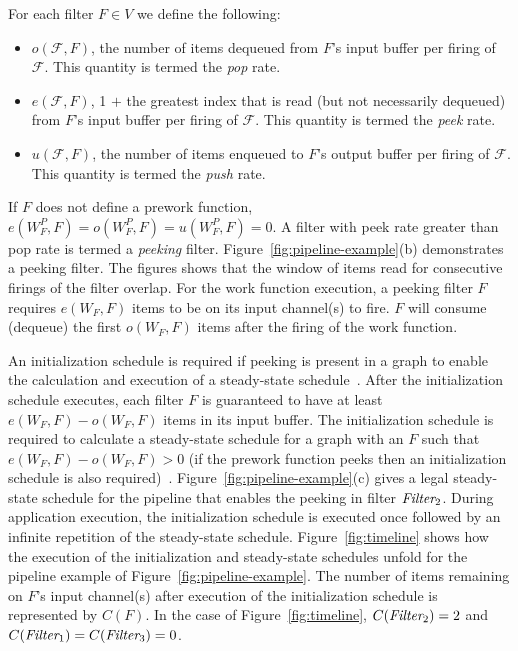 For each filter $F \in V$ we define the following:
\begin{itemize}

\item $o(\mathcal{F}, F)$, the number of items dequeued from $F$'s
input buffer per firing of $\mathcal{F}$.  This quantity is termed the
{\it pop} rate.

\item $e(\mathcal{F}, F)$, 1 $+$ the greatest index that is read (but
  not necessarily dequeued) from $F$'s input buffer per firing of
  $\mathcal{F}$.  This quantity is termed the {\it peek} rate.

\item $u(\mathcal{F}, F)$, the number of items enqueued to $F$'s
output buffer per firing of $\mathcal{F}$.  This quantity is termed
the {\it push} rate.

\end{itemize}

\noindent If $F$ does not define a prework function, $e(W^P_F, F) = o(W^P_F, F) =
u(W^P_F, F) = 0$.  A filter with peek rate greater than pop rate is
termed a {\it peeking} filter.  Figure~\ref{fig:pipeline-example}(b)
demonstrates a peeking filter.  The figures shows that the window of
items read for consecutive firings of the filter overlap.  For the
work function execution, a peeking filter $F$ requires $e(W_F, F)$
items to be on its input channel(s) to fire.  $F$ will consume
(dequeue) the first $o(W_F, F)$ items after the firing of the work function.

An initialization schedule is required if peeking is present in a
graph to enable the calculation and execution of a steady-state
schedule~\cite{karczma-thesis}.  After the initialization schedule
executes, each filter $F$ is guaranteed to have at least $e(W_F, F) -
o(W_F, F)$ items in its input buffer. The initialization schedule is
required to calculate a steady-state schedule for a graph with an $F$
such that $e(W_F, F) - o(W_F, F) > 0$ (if the prework function peeks
then an initialization schedule is also
required)~\cite{karczmarek-lctes03}.
Figure~\ref{fig:pipeline-example}(c) gives a legal steady-state
schedule for the pipeline that enables the peeking in filter
$\mbox{\it Filter}_2$.  During application execution, the initialization schedule
is executed once followed by an infinite repetition of the
steady-state schedule.  Figure~\ref{fig:timeline} shows how the
execution of the initialization and steady-state schedules unfold for
the pipeline example of Figure~\ref{fig:pipeline-example}.  The number
of items remaining on $F$'s input channel(s) after execution of the
initialization schedule is represented by $C(F)$.  In the case of
Figure~\ref{fig:timeline}, $C(\mbox{\it Filter}_2) = 2$ and
$C(\mbox{\it Filter}_1) = C(\mbox{\it Filter}_3) = 0$.


